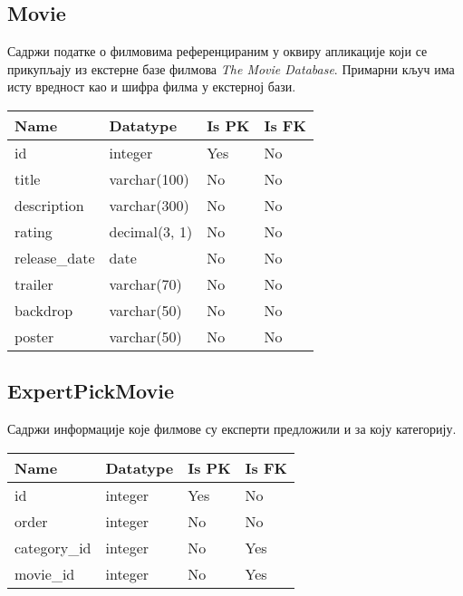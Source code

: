 \subsection{Movie}

Садржи податке о филмовима референцираним у оквиру апликације који се прикупљају из
екстерне базе филмова \textit{The Movie Database}. Примарни кључ има исту вредност као
и шифра филма у екстерној бази.

\vspace{0.5cm}

\noindent
\setcellgapes{4pt}
\makegapedcells
\begin{tabularx}{\linewidth}{|X|X|X|X|}
    \hline
    \textbf{Name} & \textbf{Datatype} & \textbf{Is PK} & \textbf{Is FK} \\
    \hline
    id & integer & Yes & No \\
    \hline
    title & varchar(100) & No & No \\
    \hline
    description & varchar(300) & No & No \\
    \hline
    rating & decimal(3, 1) & No & No \\
    \hline
    release\_date & date & No & No \\
    \hline
    trailer & varchar(70) & No & No \\
    \hline
    backdrop & varchar(50) & No & No \\
    \hline
    poster & varchar(50) & No & No \\
    \hline
\end{tabularx}

\subsection{ExpertPickMovie}

Садржи информације које филмове су експерти предложили и за коју категорију.

\vspace{0.5cm}

\noindent
\setcellgapes{4pt}
\makegapedcells
\begin{tabularx}{\linewidth}{|X|X|X|X|}
    \hline
    \textbf{Name} & \textbf{Datatype} & \textbf{Is PK} & \textbf{Is FK} \\
    \hline
    id & integer & Yes & No \\
    \hline
    order & integer & No & No \\
    \hline
    category\_id & integer & No & Yes \\
    \hline
    movie\_id & integer & No & Yes \\
    \hline
\end{tabularx}

